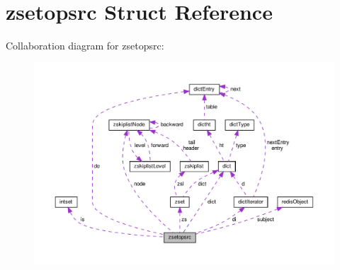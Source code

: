 \hypertarget{structzsetopsrc}{}\section{zsetopsrc Struct Reference}
\label{structzsetopsrc}


Collaboration diagram for zsetopsrc\+:
\nopagebreak
\begin{figure}[H]
\begin{center}
\leavevmode
\includegraphics[width=350pt]{structzsetopsrc__coll__graph}
\end{center}
\end{figure}
